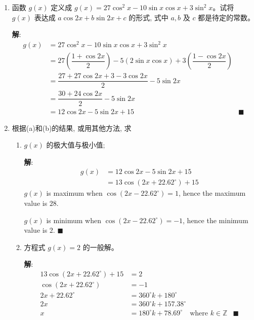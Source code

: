 \documentclass{report}
\newcommand{\sol}{\vspace{0.2cm}\textbf{解}:}
\begin{document}
\begin{enumerate}[leftmargin=*]
\begin{enumerate}
            \item 函数 $g(x)$ 定义成 $g(x)=27 \cos ^2 x-10 \sin x \cos x+3 \sin ^2 x$。试将 $g(x)$ 表达成 $a \cos 2 x+b \sin 2 x+c$ 的形式, 式中 $a, b$ 及 $c$ 都是待定的常数。
            
            \sol{}
            \begin{align*}
                g(x) &= 27 \cos ^2 x-10 \sin x \cos x+3 \sin ^2 x\\
                & = 27\left(\dfrac{1 + \cos 2x}{2}\right) - 5(2\sin x\cos x) + 3\left(\dfrac{1 - \cos 2x}{2}\right)\\
                & = \dfrac{27 + 27\cos 2x + 3 - 3\cos 2x}{2} - 5\sin 2x\\
                & = \dfrac{30 + 24\cos 2x}{2} - 5\sin 2x\\
                & = 12\cos 2x - 5\sin 2x + 15 & \blacksquare
            \end{align*}
            
            \newpage
            \item 根据(a)和(b)的结果, 或用其他方法, 求
            \begin{enumerate}[label=\roman*]
                \item $g(x)$ 的极大值与极小值;
                
                \sol{}
                \begin{align*}
                    g(x) &= 12\cos 2x - 5\sin 2x + 15\\
                    & = 13\cos(2x + 22.62^{\circ}) + 15
                \end{align*}
                $g(x)$ is maximum when $\cos(2x - 22.62^{\circ}) = 1$, hence the maximum value is $28$.

                $g(x)$ is minimum when $\cos(2x - 22.62^{\circ}) = -1$, hence the minimum value is $2$. \hfill $\blacksquare$

                \item 方程式 $g(x)=2$ 的一般解。
                
                \sol{}
                \begin{align*}
                    13\cos(2x + 22.62^{\circ}) + 15 &= 2\\
                    \cos(2x + 22.62^{\circ}) &= -1\\
                    2x + 22.62^{\circ} &= 360^{\circ}k + 180^{\circ}\\
                2x &= 360^{\circ}k + 157.38^{\circ}\\
                x &= 180^{\circ}k + 78.69^{\circ} \quad \text{where } k \in \mathbb{Z} & \blacksquare
                \end{align*}
            \end{enumerate}
        \end{enumerate}


\end{enumerate}
\end{document}
